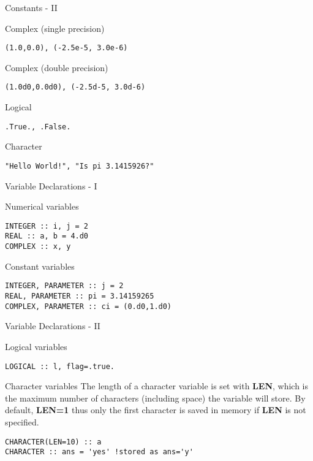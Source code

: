 \begin{frame}[fragile]{Constants - II}
\begin{block}{Complex (single precision)}
\begin{lstlisting}
(1.0,0.0), (-2.5e-5, 3.0e-6)
\end{lstlisting}
\end{block}
\begin{block}{Complex (double precision)}
\begin{lstlisting}
(1.0d0,0.0d0), (-2.5d-5, 3.0d-6)
\end{lstlisting}
\end{block}
\begin{block}{Logical}
\begin{lstlisting}
.True., .False.
\end{lstlisting}
\end{block}
\begin{block}{Character}
\begin{lstlisting}
"Hello World!", "Is pi 3.1415926?"
\end{lstlisting}
\end{block}
\end{frame}

\begin{frame}[fragile]{Variable Declarations - I}
\begin{block}{Numerical variables}
\begin{lstlisting}
INTEGER :: i, j = 2
REAL :: a, b = 4.d0
COMPLEX :: x, y
\end{lstlisting}
\end{block}
\begin{block}{Constant variables}
\begin{lstlisting}
INTEGER, PARAMETER :: j = 2
REAL, PARAMETER :: pi = 3.14159265
COMPLEX, PARAMETER :: ci = (0.d0,1.d0)
\end{lstlisting}
\end{block}
\end{frame}

\begin{frame}[fragile]{Variable Declarations - II}
\begin{block}{Logical variables}
\begin{lstlisting}
LOGICAL :: l, flag=.true.
\end{lstlisting}
\end{block}
\begin{block}{Character variables}
The length of a character variable is set with \textbf{LEN}, which is 
the maximum number of characters (including space) the variable will store.
By default, \textbf{LEN=1} thus only the first character is saved in memory 
if \textbf{LEN} is not specified.
\begin{lstlisting}
CHARACTER(LEN=10) :: a
CHARACTER :: ans = 'yes' !stored as ans='y'
\end{lstlisting}
\end{block}
\end{frame}

